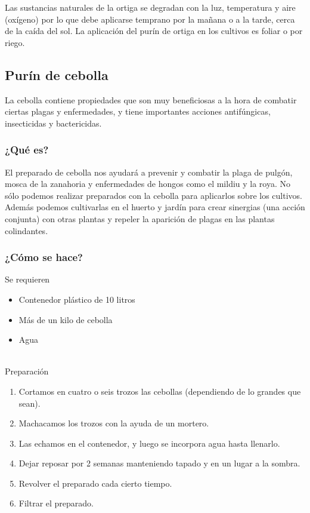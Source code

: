 \documentclass[../main.tex]{subfiles}
\begin{document}
Las sustancias naturales de la ortiga se degradan con la luz, temperatura y aire (oxígeno) por lo que debe aplicarse temprano por la mañana o a la tarde, cerca de la caída del sol. 
La aplicación del purín de ortiga en los cultivos es foliar o por riego. 

\subsection{Purín de cebolla}

La cebolla contiene propiedades que son muy beneficiosas a la hora de combatir ciertas plagas y enfermedades, y tiene importantes acciones antifúngicas, insecticidas y bactericidas. 

\subsubsection{¿Qué es?}

El preparado de cebolla nos ayudará a prevenir y combatir la plaga de pulgón, mosca de la zanahoria y enfermedades de hongos como el mildiu y la roya. 
No sólo podemos realizar preparados con la cebolla para aplicarlos sobre los cultivos. Además podemos cultivarlas en el huerto y jardín para crear sinergias (una acción conjunta) con otras plantas y repeler la aparición de plagas en las plantas colindantes. 

\subsubsection{¿Cómo se hace?}

Se requieren \\
\begin{itemize}
    \item Contenedor plástico de 10 litros
    \item Más de un kilo de cebolla
    \item Agua
\end{itemize}

\hfill\\

Preparación\\
\begin{enumerate}
    \item Cortamos en cuatro o seis trozos las cebollas (dependiendo de lo grandes que sean).
    \item Machacamos los trozos con la ayuda de un mortero. 
    \item Las echamos en el contenedor, y luego se incorpora agua hasta llenarlo.
    \item Dejar reposar por 2 semanas manteniendo tapado y en un lugar a la sombra.
    \item Revolver el preparado cada cierto tiempo. 
    \item Filtrar el preparado.
\end{enumerate}
\end{document}
